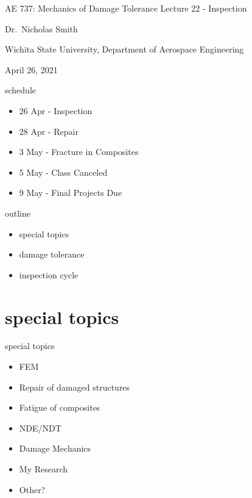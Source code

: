 \documentclass[
  letterpaper,
  ignorenonframetext,
  aspectratio=43,
  handout,
  12pt]{beamer}
\author{}
\date{}
\providecommand{\tightlist}{%
  \setlength{\itemsep}{0pt}\setlength{\parskip}{0pt}}
\providecommand{\tightlist}{%
\setlength{\itemsep}{0pt}\setlength{\parskip}{0pt}}
\begin{document}
\begin{frame}{AE 737: Mechanics of Damage Tolerance}
\protect\hypertarget{ae-737-mechanics-of-damage-tolerance}{}
Lecture 22 - Inspection

Dr.~Nicholas Smith

Wichita State University, Department of Aerospace Engineering

April 26, 2021
\end{frame}

\begin{frame}{schedule}
\protect\hypertarget{schedule}{}
\begin{itemize}
\tightlist
\item
  26 Apr - Inspection
\item
  28 Apr - Repair
\item
  3 May - Fracture in Composites
\item
  5 May - Class Canceled
\item
  9 May - Final Projects Due
\end{itemize}
\end{frame}

\begin{frame}{outline}
\protect\hypertarget{outline}{}
\begin{itemize}
\tightlist
\item
  special topics
\item
  damage tolerance
\item
  inspection cycle
\end{itemize}
\end{frame}

\hypertarget{special-topics}{%
\section{special topics}\label{special-topics}}

\begin{frame}{special topics}
\protect\hypertarget{special-topics-1}{}
\begin{itemize}
\tightlist
\item
  FEM
\item
  Repair of damaged structures
\item
  Fatigue of composites
\item
  NDE/NDT
\item
  Damage Mechanics
\item
  My Research
\item
  Other?
\end{itemize}
\end{frame}
\end{document}
